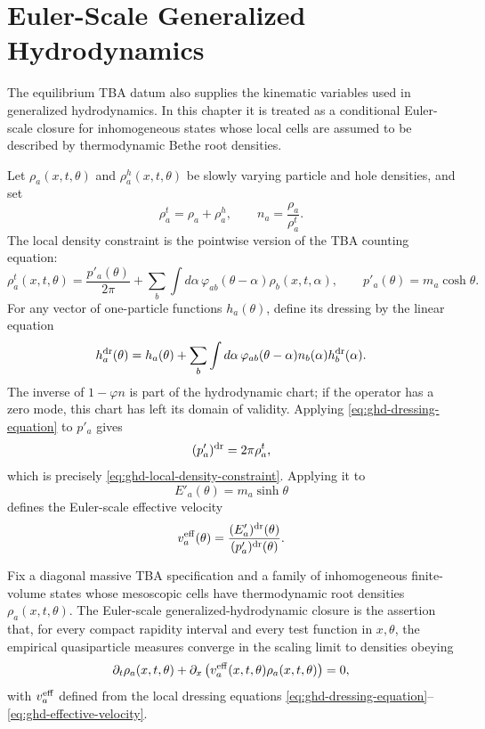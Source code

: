 \section{Euler-Scale Generalized Hydrodynamics}
\label{sec:tba-generalized-hydrodynamics}

The equilibrium TBA datum also supplies the kinematic variables used in
generalized hydrodynamics.  In this chapter it is treated as a conditional
Euler-scale closure for inhomogeneous states whose local cells are assumed to
be described by thermodynamic Bethe root densities.

Let \(\rho_a(x,t,\theta)\) and \(\rho_a^h(x,t,\theta)\) be slowly varying
particle and hole densities, and set
\[
  \rho_a^t=\rho_a+\rho_a^h,
  \qquad
  n_a=\frac{\rho_a}{\rho_a^t}.
\]
The local density constraint is the pointwise version of the TBA counting
equation:
\begin{equation}
  \rho_a^t(x,t,\theta)
  =
  \frac{p'_a(\theta)}{2\pi}
  +
  \sum_b\int d\alpha\,
  \varphi_{ab}(\theta-\alpha)\rho_b(x,t,\alpha),
  \qquad
  p'_a(\theta)=m_a\cosh\theta .
  \label{eq:ghd-local-density-constraint}
\end{equation}
For any vector of one-particle functions \(h_a(\theta)\), define its dressing
by the linear equation
\begin{equation}
  h_a^{\rm dr}(\theta)
  =
  h_a(\theta)
  +
  \sum_b\int d\alpha\,
  \varphi_{ab}(\theta-\alpha)
  n_b(\alpha)h_b^{\rm dr}(\alpha).
  \label{eq:ghd-dressing-equation}
\end{equation}
The inverse of \(1-\varphi n\) is part of the hydrodynamic chart; if the
operator has a zero mode, this chart has left its domain of validity.
Applying \eqref{eq:ghd-dressing-equation} to \(p'_a\) gives
\[
  (p'_a)^{\rm dr}=2\pi\rho_a^t,
\]
which is precisely \eqref{eq:ghd-local-density-constraint}.  Applying it to
\[
  E'_a(\theta)=m_a\sinh\theta
\]
defines the Euler-scale effective velocity
\begin{equation}
  v_a^{\rm eff}(\theta)
  =
  \frac{(E'_a)^{\rm dr}(\theta)}
       {(p'_a)^{\rm dr}(\theta)} .
  \label{eq:ghd-effective-velocity}
\end{equation}

\begin{hypothesis}
\label{hyp:euler-scale-ghd-closure}
Fix a diagonal massive TBA specification and a family of inhomogeneous finite-volume
states whose mesoscopic cells have thermodynamic root densities
\(\rho_a(x,t,\theta)\).  The Euler-scale generalized-hydrodynamic closure is
the assertion that, for every compact rapidity interval and every test
function in \(x,\theta\), the empirical quasiparticle measures converge in
the scaling limit to densities obeying
\begin{equation}
  \partial_t\rho_a(x,t,\theta)
  +
  \partial_x
  \left(
    v_a^{\rm eff}(x,t,\theta)\rho_a(x,t,\theta)
  \right)
  =
  0,
  \label{eq:ghd-root-density-continuity}
\end{equation}
with \(v_a^{\rm eff}\) defined from the local dressing equations
\eqref{eq:ghd-dressing-equation}--\eqref{eq:ghd-effective-velocity}.
\end{hypothesis}

